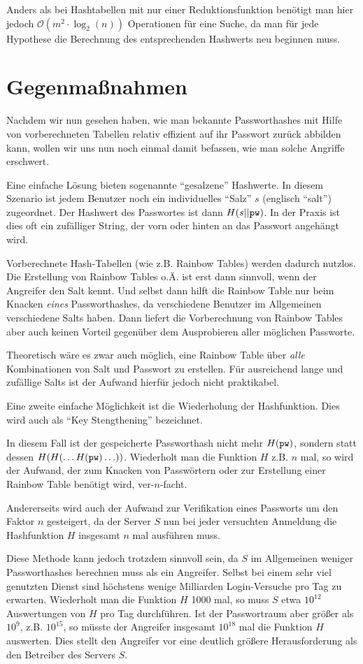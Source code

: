 Anders als bei Hashtabellen mit nur einer Reduktionsfunktion benötigt
man hier jedoch $\mathcal{O}(m^2 \cdot \log_2(n))$ Operationen für eine
Suche, da man für jede Hypothese die Berechnung des entsprechenden
Hashwerts neu beginnen muss.

\section{Gegenmaßnahmen}

Nachdem wir nun gesehen haben, wie man bekannte Passworthashes mit Hilfe
von vorberechneten Tabellen relativ effizient auf ihr Passwort zurück
abbilden kann, wollen wir uns nun noch einmal damit befassen, wie man
solche Angriffe erschwert.

Eine einfache Lösung bieten sogenannte "`gesalzene"' Hashwerte. In
diesem Szenario ist jedem Benutzer noch ein individuelles "`Salz"' $s$
(englisch "`salt"') zugeordnet. Der Hashwert des Passwortes ist dann
$H(s || \texttt{pw})$. In der Praxis ist dies oft ein zufälliger String, der vorn
oder hinten an das Passwort angehängt wird.

Vorberechnete Hash-Tabellen (wie z.B. Rainbow Tables) werden dadurch
nutzlos. Die Erstellung von Rainbow Tables o.Ä. ist erst dann sinnvoll,
wenn der Angreifer den Salt kennt. Und selbst dann hilft die Rainbow
Table nur beim Knacken \emph{eines} Passworthashes, da verschiedene
Benutzer im Allgemeinen verschiedene Salts haben. Dann liefert die
Vorberechnung von Rainbow Tables aber auch keinen Vorteil gegenüber dem
Ausprobieren aller möglichen Passworte.

Theoretisch wäre es zwar auch möglich, eine Rainbow Table über
\emph{alle} Kombinationen von Salt und Passwort zu erstellen. Für
ausreichend lange und zufällige Salts ist der Aufwand hierfür jedoch
nicht praktikabel.

Eine zweite einfache Möglichkeit ist die Wiederholung der
Hashfunktion. Dies wird auch als "`Key Stengthening"' bezeichnet.

In diesem Fall ist der gespeicherte Passworthash nicht mehr $H(\texttt{pw})$,
sondern statt dessen $H(H(\ldots H(\texttt{pw})\ldots))$. Wiederholt man die Funktion $H$
z.B. $n$ mal, so wird der Aufwand, der zum Knacken von Passwörtern oder
zur Erstellung einer Rainbow Table benötigt wird, ver-$n$-facht.

Andererseits wird auch der Aufwand zur Verifikation eines Passworts um
den Faktor $n$ gesteigert, da der Server $S$ nun bei jeder versuchten
Anmeldung die Hashfunktion $H$ insgesamt $n$ mal ausführen muss.

Diese Methode kann jedoch trotzdem sinnvoll sein, da $S$ im Allgemeinen
weniger Passworthashes berechnen muss als ein Angreifer. Selbst bei
einem sehr viel genutzten Dienst sind höchstens wenige Milliarden
Login-Versuche pro Tag zu erwarten. Wiederholt man die Funktion $H$ 1000
mal, so muss $S$ etwa $10^{12}$ Auswertungen von $H$ pro Tag
durchführen. Ist der Passwortraum aber größer als $10^9$,
z.B. $10^{15}$, so müsste der Angreifer insgesamt $10^{18}$ mal die
Funktion $H$ auswerten. Dies stellt den Angreifer vor eine deutlich
größere Herausforderung als den Betreiber des Servers $S$.


